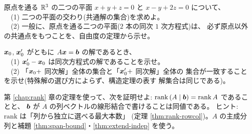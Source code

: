 \begin{mondai}[発展]\label{q:sol-ex10}
原点を通る $\mathbb{R}^3$ の二つの平面
$x + y + z = 0$ と $x - y + 2z = 0$ について、\\
　(1) 二つの平面の交わり(共通解の集合)を求めよ。\\
　(2) 一般に、原点を通る二つの平面($2$ 本の同次 $1$ 次方程式)は、
必ず原点以外の共通点をもつことを、自由度の定理から示せ。
\end{mondai}

\begin{mondai}[証明]\label{q:sol-ex11}
$\bm{x}_0$, $\bm{x}_0'$ がともに $A\bm{x} = \bm{b}$ の解であるとき、\\
　(1) $\bm{x}_0' - \bm{x}_0$ は同次方程式の解であることを示せ。\\
　(2) 「$\bm{x}_0 +$ 同次解」全体の集合と「$\bm{x}_0' +$ 同次解」全体の
集合が一致することを示せ(特殊解の選び方によらず、構造定理の表す
解集合は同じである)。
\end{mondai}

\begin{mondai}[証明]\label{q:sol-ex12}
第 \ref{chap:rank} 章の定理を使って、次を証明せよ:
$\mathrm{rank}\,(A \mid \bm{b}) = \mathrm{rank}\,A$ であることと、
$\bm{b}$ が $A$ の列ベクトルの線形結合で書けることは同値である。
ヒント:$\mathrm{rank}$ は「列から独立に選べる最大本数」
(定理 \ref{thm:rank-rowcol})。$A$ の主成分列と補題
\ref{thm:span-bound}・\ref{thm:extend-indep} を使う。
\end{mondai}

